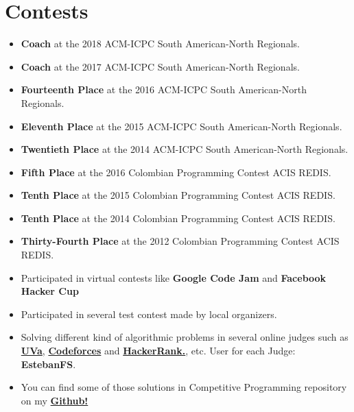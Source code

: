 \documentclass[a4paper,11pt]{article} %
\begin{document}
\newpage
\section{Contests}
\begin{itemize}
\item \textbf{Coach} at the 2018 ACM-ICPC South American-North Regionals.
\item \textbf{Coach} at the 2017 ACM-ICPC South American-North Regionals.
\item \textbf{Fourteenth Place} at the 2016 ACM-ICPC South American-North Regionals.
\item \textbf{Eleventh Place} at the 2015 ACM-ICPC South American-North Regionals.
\item \textbf{Twentieth Place} at the 2014 ACM-ICPC South American-North Regionals.
\item \textbf{Fifth Place} at the 2016 Colombian Programming Contest ACIS REDIS.
\item \textbf{Tenth Place} at the 2015 Colombian Programming Contest ACIS REDIS.
\item \textbf{Tenth Place} at the 2014 Colombian Programming Contest ACIS REDIS.
\item \textbf{Thirty-Fourth Place} at the 2012 Colombian Programming Contest ACIS REDIS.
\item Participated in virtual contests like \textbf{Google Code Jam} and \textbf{Facebook Hacker Cup}
\item Participated in several test contest made by local organizers.
\item Solving different kind of algorithmic problems in several online judges such as
\href{http://uhunt.felix-halim.net/id/152728}{\textbf{UVa}}, \href{http://codeforces.com/profile/EstebanFS}{\textbf{Codeforces}} and \href{https://www.hackerrank.com/EstebanFS}{\textbf{HackerRank.}}, etc.
User for each Judge: \textbf{EstebanFS}.
\item You can find some of those solutions in Competitive Programming repository on my \href{https://github.com/EstebanFS/Competitive-Programming}{\textbf{Github!}}
\end{itemize}


\end{document}
